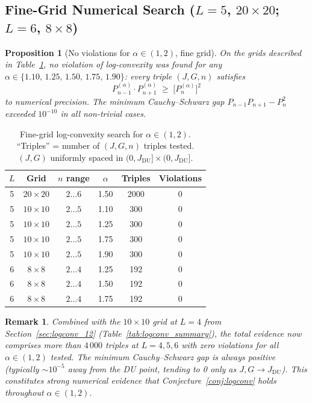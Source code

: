 \documentclass[12pt,a4paper]{article}
\newtheorem{proposition}[theorem]{Proposition}
\newtheorem{remark}[theorem]{Remark}
\begin{document}
\subsection{Fine-Grid Numerical Search ($L=5$, $20\times20$; $L=6$, $8\times8$)}
\label{sec:fgrid}

\begin{proposition}[No violations for $\alpha\in(1,2)$, fine grid]
\label{prop:fgrid_noc}
On the grids described in Table~\ref{tab:fgrid_results}, no violation of
log-convexity was found for any $\alpha\in\{1.10,\,1.25,\,1.50,\,1.75,\,1.90\}$:
every triple $(J,G,n)$ satisfies
\[
  P_{n-1}^{(\alpha)}\cdot P_{n+1}^{(\alpha)}\;\geq\;
  \bigl[P_n^{(\alpha)}\bigr]^2
\]
to numerical precision.  The minimum Cauchy--Schwarz gap $P_{n-1}P_{n+1}-P_n^2$
exceeded $10^{-10}$ in all non-trivial cases.
\end{proposition}

\begin{table}[h!]
\centering
\caption{Fine-grid log-convexity search for $\alpha\in(1,2)$.
``Triples'' = number of $(J,G,n)$ triples tested.
$(J,G)$ uniformly spaced in $(0,J_\mathrm{DU}]\times(0,J_\mathrm{DU}]$.}
\label{tab:fgrid_results}
\begin{tabular}{c|c|c|c|c|c}
$L$ & Grid & $n$ range & $\alpha$ & Triples & Violations \\
\hline
5 & $20\times20$ & $2\ldots6$ & 1.50 & 2000 & 0 \\
5 & $10\times10$ & $2\ldots5$ & 1.10 & 300 & 0 \\
5 & $10\times10$ & $2\ldots5$ & 1.25 & 300 & 0 \\
5 & $10\times10$ & $2\ldots5$ & 1.75 & 300 & 0 \\
5 & $10\times10$ & $2\ldots5$ & 1.90 & 300 & 0 \\
6 & $8\times8$ & $2\ldots4$ & 1.25 & 192 & 0 \\
6 & $8\times8$ & $2\ldots4$ & 1.50 & 192 & 0 \\
6 & $8\times8$ & $2\ldots4$ & 1.75 & 192 & 0 \\
\end{tabular}
\end{table}

\begin{remark}
Combined with the $10\times10$ grid at $L=4$ from Section~\ref{sec:logconv_12}
(Table~\ref{tab:logconv_summary}), the total evidence now comprises
more than $4\,000$ triples at $L=4,5,6$ with zero violations for all
$\alpha\in(1,2)$ tested.
The minimum Cauchy--Schwarz gap is always positive (typically $\sim10^{-5}$ away
from the DU point, tending to 0 only as $J,G\to J_\mathrm{DU}$).
This constitutes strong numerical evidence that Conjecture~\ref{conj:logconv}
holds throughout $\alpha\in(1,2)$.
\end{remark}
\end{document}

